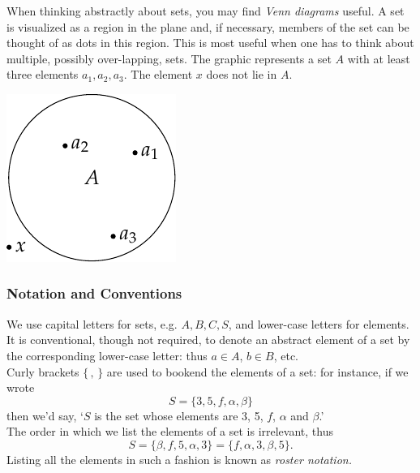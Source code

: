 \noindent\begin{minipage}{0.73\textwidth}
When thinking abstractly about sets, you may find \emph{Venn diagrams} useful. A set is visualized as a region in the plane and, if necessary, members of the set can be thought of as dots in this region. This is most useful when one has to think about multiple, possibly over-lapping, sets. The graphic represents a set $A$ with at least three elements $a_1,a_2,a_3$. The element $x$ does not lie in $A$. 
\vspace{5pt}
\end{minipage}\hfill
\begin{minipage}{0.20\textwidth}
\includegraphics[width=\textwidth]{sets-01-venn}
\end{minipage}


\subsubsection*{Notation and Conventions}

We use capital letters for sets, e.g. $A,B,C,S$, and lower-case letters for elements. It is conventional, though not required, to denote an abstract element of a set by the corresponding lower-case letter: thus $a\in A$, $b\in B$, etc.\\
Curly brackets $\{\,,\,\}$ are used to bookend the elements of a set: for instance, if we wrote
\[S=\{3,5,f,\alpha,\beta\}\]
then we'd say, `$S$ is the set whose elements are 3, 5, $f$, $\alpha$ and $\beta$.'\\
The order in which we list the elements of a set is irrelevant, thus
\[S=\{\beta,f,5,\alpha,3\}=\{f,\alpha,3,\beta,5\}.\]
Listing all the elements in such a fashion is known as \emph{roster notation.}

